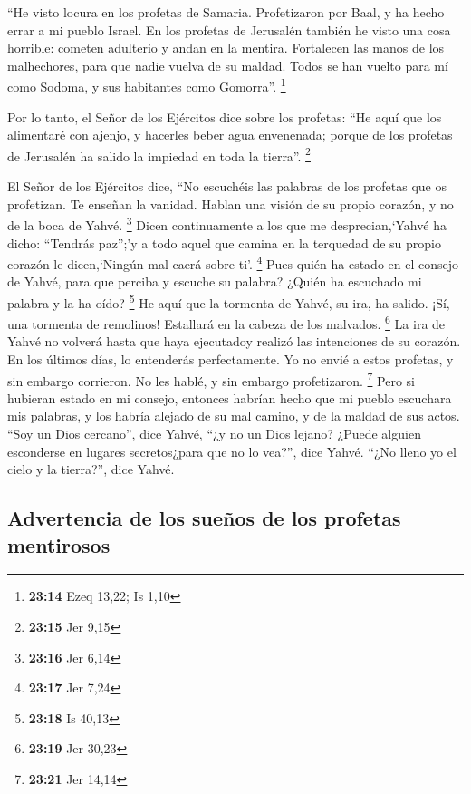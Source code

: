 \begin{paracol}{2}
 ``He visto locura en los profetas de Samaria.
Profetizaron por Baal, y ha hecho errar a mi pueblo Israel.
 En los profetas de Jerusalén también he visto una cosa
horrible: cometen adulterio y andan en la mentira. Fortalecen las manos
de los malhechores, para que nadie vuelva de su maldad. Todos se han
vuelto para mí como Sodoma, y sus habitantes como Gomorra''. \footnote{\textbf{23:14}
  Ezeq 13,22; Is 1,10}

 Por lo tanto, el Señor de los Ejércitos dice sobre los
profetas: ``He aquí que los alimentaré con ajenjo, y hacerles beber agua
envenenada; porque de los profetas de Jerusalén ha salido la impiedad en
toda la tierra''. \footnote{\textbf{23:15} Jer 9,15}

 El Señor de los Ejércitos dice, ``No escuchéis las
palabras de los profetas que os profetizan. Te enseñan la vanidad.
Hablan una visión de su propio corazón, y no de la boca de Yahvé.
\footnote{\textbf{23:16} Jer 6,14}  Dicen continuamente a
los que me desprecian,`Yahvé ha dicho: ``Tendrás paz'';'y a todo aquel
que camina en la terquedad de su propio corazón le dicen,`Ningún mal
caerá sobre ti'. \footnote{\textbf{23:17} Jer 7,24}  Pues
quién ha estado en el consejo de Yahvé, para que perciba y escuche su
palabra? ¿Quién ha escuchado mi palabra y la ha oído? \footnote{\textbf{23:18}
  Is 40,13}  He aquí que la tormenta de Yahvé, su ira, ha
salido. ¡Sí, una tormenta de remolinos! Estallará en la cabeza de los
malvados. \footnote{\textbf{23:19} Jer 30,23}  La ira de
Yahvé no volverá hasta que haya ejecutadoy realizó las intenciones de su
corazón. En los últimos días, lo entenderás perfectamente.
 Yo no envié a estos profetas, y sin embargo corrieron.
No les hablé, y sin embargo profetizaron. \footnote{\textbf{23:21} Jer
  14,14}  Pero si hubieran estado en mi consejo, entonces
habrían hecho que mi pueblo escuchara mis palabras, y los habría alejado
de su mal camino, y de la maldad de sus actos.  ``Soy un
Dios cercano'', dice Yahvé, ``¿y no un Dios lejano? 
¿Puede alguien esconderse en lugares secretos¿para que no lo vea?'',
dice Yahvé. ``¿No lleno yo el cielo y la tierra?'', dice Yahvé.

\hypertarget{advertencia-de-los-sueuxf1os-de-los-profetas-mentirosos}{%
\subsection{Advertencia de los sueños de los profetas
mentirosos}\label{advertencia-de-los-sueuxf1os-de-los-profetas-mentirosos}}


\end{paracol}
